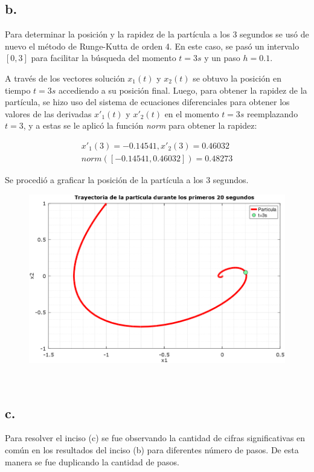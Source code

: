 \documentclass[11pt]{article}
\begin{document}
\subsection*{b.}

Para determinar la posición y la rapidez de la partícula a los 3 segundos se usó de nuevo el método de Runge-Kutta de orden 4. En este caso, se pasó un intervalo $[0,3]$ para facilitar la búsqueda del momento $t=3s$ y un paso $h=0.1$.

A través de los vectores solución $x_1(t)$ y $x_2(t)$ se obtuvo la posición en tiempo $t=3s$ accediendo a su posición final. Luego, para obtener la rapidez de la partícula, se hizo uso del sistema de ecuaciones diferenciales para obtener los valores de las derivadas $x'_1(t)$ y $x'_2(t)$ en el momento $t=3s$ reemplazando $t=3$, y a estas se le aplicó la función \textit{norm} para obtener la rapidez:

\begin{equation*}
	\begin{split}
		x'_1(3)=-0.14541, x'_2(3)=0.46032\\
		norm([-0.14541,0.46032])=0.48273
	\end{split}
\end{equation*}

Se procedió a graficar la posición de la partícula a los 3 segundos.
\begin{figure}[h]
	\centering
	\includegraphics{trayectoria20s2.png}
\end{figure}\\

\subsection*{c.}
Para resolver el inciso (c) se fue observando la cantidad de cifras significativas en común en los resultados del inciso (b) para diferentes número de pasos. De esta manera se fue duplicando la cantidad de pasos.
\end{document}
